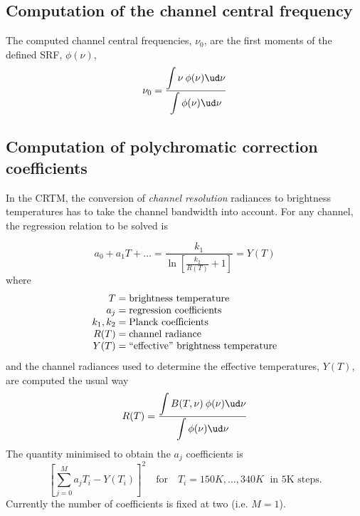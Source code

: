 \subsection{Computation of the channel central frequency}
The computed channel central frequencies, $\nu_0$, are the first moments of the defined SRF, $\phi(\nu)$,
\begin{equation}
  \nu_0 = \frac{\displaystyle\int{\nu\:\phi(\nu)\ud \nu}}{\displaystyle\int{\phi(\nu)\ud \nu}}
\end{equation}


\subsection{Computation of polychromatic correction coefficients}
In the CRTM, the conversion of \emph{channel resolution} radiances to brightness temperatures has to take the channel bandwidth into account. For any channel, the regression relation to be solved is

\begin{equation}
  a_0 + a_1T + \ldots = \frac{\displaystyle k_1}{\displaystyle \ln\left[\frac{k_2}{R(T)}+1\right]} = Y(T)
\end{equation}
where
\begin{equation}
  \begin{array}{r@{\;=\;}l}
         T &\mbox{brightness temperature} \\
        a_j&\mbox{regression coefficients} \\
    k_1,k_2&\mbox{Planck coefficients} \\
       R(T)&\mbox{channel radiance} \\
       Y(T)&\mbox{``effective'' brightness temperature}
  \end{array}
\end{equation}
and the channel radiances used to determine the effective temperatures, $Y(T)$, are computed the usual way
\begin{equation}
  R(T) = \frac{\displaystyle\int{B(T,\nu)\:\phi(\nu)\ud \nu}}{\displaystyle\int{\phi(\nu)\ud \nu}}
\end{equation}
The quantity minimised to obtain the $a_j$ coefficients is
\begin{equation}
  \left[ \sum_{j=0}^{M}a_j T_{i} - Y(T_{i}) \right]^2 \quad\mbox{for}\quad T_i = 150K, \ldots, 340K \;\mbox{ in 5K steps.}
\end{equation}
Currently the number of coefficients is fixed at two (i.e. $M=1$).



